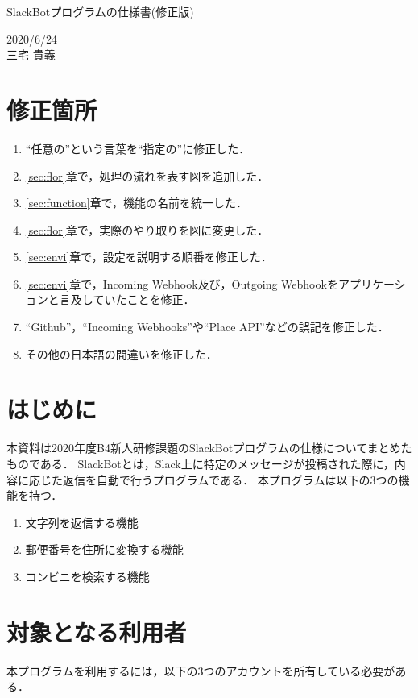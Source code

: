 \documentclass[12pt]{jsarticle}
\begin{document}
\begin{center}
{\LARGE SlackBotプログラムの仕様書(修正版)}
\end{center}

\begin{flushright}
  2020/6/24\\
  三宅 貴義
\end{flushright}
\section{修正箇所}
\begin{enumerate}
  \item “任意の”という言葉を“指定の”に修正した．
  \item \ref{sec:flor}章で，処理の流れを表す図を追加した．
  \item \ref{sec:function}章で，機能の名前を統一した．
  \item \ref{sec:flor}章で，実際のやり取りを図に変更した．
  \item \ref{sec:envi}章で，設定を説明する順番を修正した．
  \item \ref{sec:envi}章で，Incoming Webhook及び，Outgoing Webhookをアプリケーションと言及していたことを修正．
  \item “Github”，“Incoming Webhooks”や“Place API”などの誤記を修正した．
  \item その他の日本語の間違いを修正した．
\end{enumerate}

\section{はじめに}
\label{sec:introduction}
本資料は2020年度B4新人研修課題のSlackBotプログラムの仕様についてまとめたものである．
SlackBotとは，Slack上に特定のメッセージが投稿された際に，内容に応じた返信を自動で行うプログラムである．
本プログラムは以下の3つの機能を持つ．
\begin{enumerate}
  \item 文字列を返信する機能
  \item 郵便番号を住所に変換する機能
  \item コンビニを検索する機能
\end{enumerate}

\section{対象となる利用者}
本プログラムを利用するには，以下の3つのアカウントを所有している必要がある．
\end{document}
